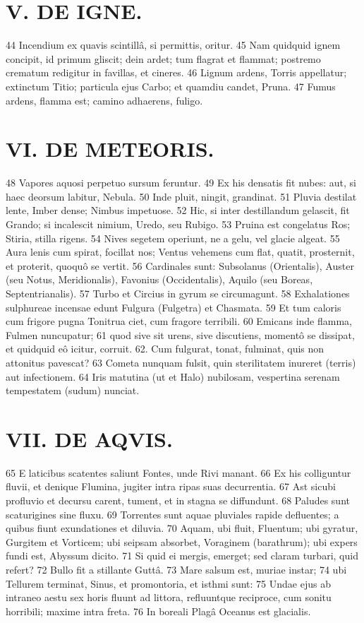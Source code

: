 \section*{V. DE IGNE.}
44 Incendium ex quavis scintillâ, si permittis, oritur. 45 Nam quidquid ignem concipit, id primum gliscit; dein ardet; tum flagrat et flammat; postremo crematum redigitur in favillas, et cineres. 46 Lignum ardens, Torris appellatur; extinctum Titio; particula ejus Carbo; et quamdiu candet, Pruna. 47 Fumus ardens, flamma est; camino adhaerens, fuligo.

\section*{VI. DE METEORIS.}
48 Vapores aquosi perpetuo sursum feruntur. 49 Ex his densatis fit nubes: aut, si haec deorsum labitur, Nebula. 50 Inde pluit, ningit, grandinat. 51 Pluvia destilat lente, Imber dense; Nimbus impetuose. 52 Hic, si inter destillandum gelascit, fit Grando; si incalescit nimium, Uredo, seu Rubigo. 53 Pruina est congelatus Ros; Stiria, stilla rigens. 54 Nives segetem operiunt, ne a gelu, vel glacie algeat. 55 Aura lenis cum spirat, focillat nos; Ventus vehemens cum flat, quatit, prosternit, et proterit, quoquô se vertit. 56 Cardinales sunt: Subsolanus (Orientalis), Auster (seu Notus, Meridionalis), Favonius (Occidentalis), Aquilo (seu Boreas, Septentrianalis). 57 Turbo et Circius in gyrum se circumagunt. 58 Exhalationes sulphureae incensae edunt Fulgura (Fulgetra) et Chasmata. 59 Et tum caloris cum frigore pugna Tonitrua ciet, cum fragore terribili. 60 Emicans inde flamma, Fulmen nuncupatur; 61 quod sive sit urens, sive discutiens, momentô se dissipat, et quidquid eô icitur, corruit. 62. Cum fulgurat, tonat, fulminat, quis non attonitus pavescat? 63 Cometa nunquam fulsit, quin sterilitatem inureret (terris) aut infectionem. 64 Iris matutina (ut et Halo) nubilosam, vespertina serenam tempestatem (sudum) nunciat.

\section*{VII. DE AQVIS.}
65 E laticibus scatentes saliunt Fontes, unde Rivi manant. 66 Ex his colliguntur fluvii, et denique Flumina, jugiter intra ripas suas decurrentia. 67 Ast sicubi profluvio et decursu carent, tument, et in stagna se diffundunt. 68 Paludes sunt scaturigines sine fluxu. 69 Torrentes sunt aquae pluviales rapide defluentes; a quibus fiunt exundationes et diluvia. 70 Aquam, ubi fluit, Fluentum; ubi gyratur, Gurgitem et Vorticem; ubi seipsam absorbet, Voraginem (barathrum); ubi expers fundi est, Abyssum dicito. 71 Si quid ei mergis, emerget; sed claram turbari, quid refert? 72 Bullo fit a stillante Guttâ. 73 Mare salsum est, muriae instar; 74 ubi Tellurem terminat, Sinus, et promontoria, et isthmi sunt: 75 Undae ejus ab intraneo aestu sex horis fluunt ad littora, refluuntque reciproce, cum sonitu horribili; maxime intra freta. 76 In boreali Plagâ Oceanus est glacialis.

